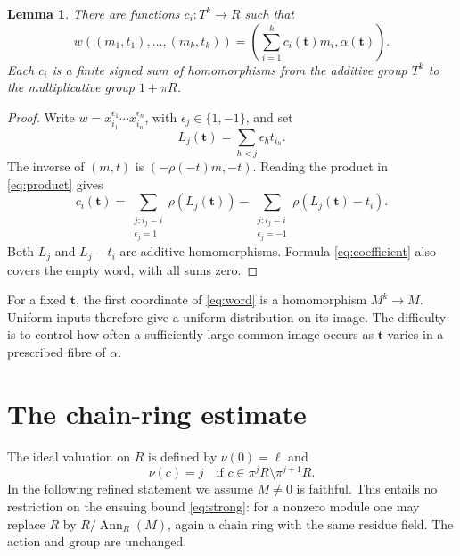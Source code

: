\documentclass[11pt]{article}
\newtheorem{lemma}[theorem]{Lemma}
\theoremstyle{remark}\newtheorem{remark}[theorem]{Remark}
\newcommand{\Ann}{\operatorname{Ann}}
\begin{document}
\begin{lemma}\label{lem:coefficients}
There are functions $c_i:T^k\to R$ such that
\begin{equation}\label{eq:word}
 w((m_1,t_1),\ldots,(m_k,t_k))
 =\left(\sum_{i=1}^k c_i(\mathbf t)m_i,\alpha(\mathbf t)\right).
\end{equation}
Each $c_i$ is a finite signed sum of homomorphisms from the additive group $T^k$ to the multiplicative group $1+\pi R$.
\end{lemma}
\begin{proof}
Write $w=x_{i_1}^{\epsilon_1}\cdots x_{i_n}^{\epsilon_n}$, with $\epsilon_j\in\{1,-1\}$, and set
\[
 L_j(\mathbf t)=\sum_{h<j}\epsilon_h t_{i_h}.
\]
The inverse of $(m,t)$ is $(-\rho(-t)m,-t)$. Reading the product in \eqref{eq:product} gives
\begin{equation}\label{eq:coefficient}
 c_i(\mathbf t)=
 \sum_{\substack{j:i_j=i\\\epsilon_j=1}}\rho(L_j(\mathbf t))
 -\sum_{\substack{j:i_j=i\\\epsilon_j=-1}}\rho(L_j(\mathbf t)-t_i).
\end{equation}
Both $L_j$ and $L_j-t_i$ are additive homomorphisms. Formula \eqref{eq:coefficient} also covers the empty word, with all sums zero.
\end{proof}

For a fixed $\mathbf t$, the first coordinate of \eqref{eq:word} is a homomorphism $M^k\to M$. Uniform inputs therefore give a uniform distribution on its image. The difficulty is to control how often a sufficiently large common image occurs as $\mathbf t$ varies in a prescribed fibre of $\alpha$.

\section{The chain-ring estimate}\label{sec:split}
The ideal valuation on $R$ is defined by $\nu(0)=\ell$ and
\[
 \nu(c)=j\quad\text{if }c\in\pi^jR\setminus\pi^{j+1}R.
\]
In the following refined statement we assume $M\ne0$ is faithful. This entails no restriction on the ensuing bound \eqref{eq:strong}: for a nonzero module one may replace $R$ by $R/\Ann_R(M)$, again a chain ring with the same residue field. The action and group are unchanged.
\end{document}
